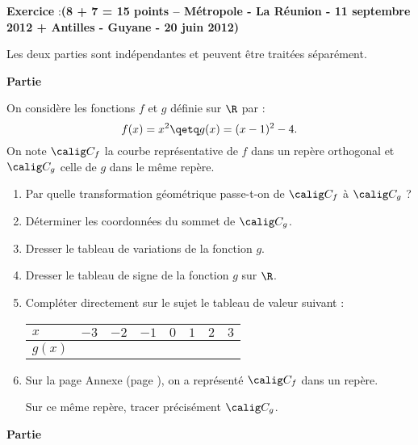 \documentclass[12pt,french]{article}
\newcounter{exoc}
\newenvironment{exoc}[1]{%
  \refstepcounter{exoc}\textbf{Exercice \theexoc} :\hfill {\footnotesize\textbf{(#1)}}\par
  \medskip}%
{\medskip}
\begin{document}
\begin{exoc}{8 + 7 = 15 points -- Métropole - La Réunion - 11 septembre 2012 + Antilles - Guyane - 20 juin 2012}

Les deux parties sont indépendantes et peuvent être traitées séparément.\medskip

\textbf{Partie} \medskip

    On considère les fonctions $f$ et $g$ définie sur $\R$ par :
    \[f(x) = x^2 \qetq g(x) = (x - 1)^2 - 4.\]
    On note $\calig C_f$ la courbe représentative de $f$ dans un repère orthogonal et $\calig C_g$ celle de $g$ dans le même repère.
    \begin{enumerate}
        \item Par quelle transformation géométrique passe-t-on de $\calig C_f$ à $\calig C_g$ ?
        \item Déterminer les coordonnées du sommet de $\calig C_g$.
        \item Dresser le tableau de variations de la fonction $g$.
        \item Dresser le tableau de signe de la fonction $g$ sur $\R$.
        \item Compléter directement sur le sujet le tableau de valeur suivant :
        \begin{center}
            \begin{tabular}{*{8}{|>{\centering\arraybackslash}m{1cm}}|}
                \hline
                    $x$ & $-3$ & $-2$ & $-1$ & $0$ & $1$ & $2$ & $3$ \\
                \hline
                    $g(x)$ & & & & & & & \\
                \hline
            \end{tabular}
        \end{center}
        \item Sur la page Annexe (page \pageref{Annexe}), on a représenté $\calig C_f$ dans un repère.\par Sur ce même repère, tracer précisément $\calig C_g$.
    \end{enumerate}\medskip

\textbf{Partie} \medskip


\end{exoc}
\end{document}
